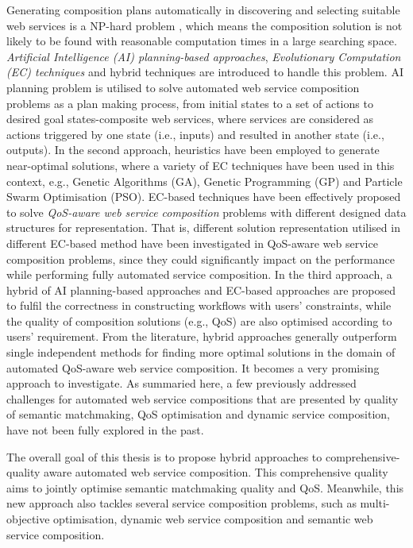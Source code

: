 Generating composition plans automatically in discovering and selecting suitable web services is a NP-hard problem \cite{moghaddam2014service}, which means the composition solution is not likely to be found with reasonable computation times in a large searching space. \emph{Artificial Intelligence (AI) planning-based approaches}, \emph{Evolutionary Computation (EC) techniques} and hybrid techniques  are introduced to handle this problem. AI planning problem is utilised to solve automated web service composition problems as a plan making process, from initial states to a set of actions to desired goal states-composite web services, where services are considered as actions triggered by one state (i.e., inputs) and resulted in another state (i.e., outputs). In the second approach, heuristics have been employed to generate near-optimal solutions, where a variety of EC techniques have been used in this context, e.g., Genetic Algorithms (GA), Genetic Programming (GP) and Particle Swarm Optimisation (PSO). EC-based techniques have been effectively proposed to solve \emph{QoS-aware web service composition} problems with different designed data structures for representation. That is, different solution representation utilised in different EC-based method have been investigated in QoS-aware web service composition problems, since they could significantly impact on the performance while performing fully automated service composition. In the third approach, a hybrid of AI planning-based approaches and EC-based approaches \cite{da2016genetic,ma2015hybrid} are proposed to fulfil the correctness in constructing workflows with users' constraints, while the quality of composition solutions (e.g., QoS) are also optimised according to users' requirement. From the literature, hybrid approaches generally outperform single independent methods for finding more optimal solutions in the domain of automated QoS-aware web service composition. It becomes a very promising approach to investigate. As summaried here, a few previously addressed challenges for automated web service compositions that are presented by quality of semantic matchmaking, QoS optimisation and dynamic service composition, have not been fully explored in the past.

The overall goal of this thesis is to propose hybrid approaches to comprehensive-quality aware automated web service composition. This comprehensive quality aims to jointly optimise semantic matchmaking quality and QoS. Meanwhile, this new approach also tackles several service composition problems, such as multi-objective optimisation, dynamic web service composition and semantic web service composition.


